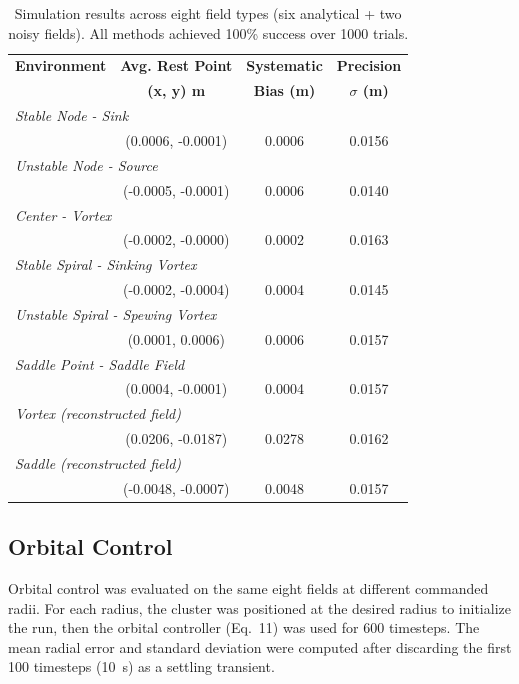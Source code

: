 \documentclass[lettersize,journal]{IEEEtran}
\begin{document}
\begin{table}[!t]
\footnotesize
\centering
\caption{Simulation results across eight field types (six analytical + two noisy fields). All methods achieved 100\% success over 1000 trials.}
\label{tab:simulation_estimation_results}
\setlength{\tabcolsep}{4pt}
\begin{tabular}{lccc}
\hline
\textbf{Environment} & \textbf{Avg. Rest Point} & \textbf{Systematic} & \textbf{Precision} \\
 & \textbf{(x, y) m} & \textbf{Bias (m)} & \textbf{$\sigma$ (m)} \\
\hline
\multicolumn{4}{l}{\textit{Stable Node - Sink}} \\
\hline
 & (0.0006, -0.0001) & 0.0006 & 0.0156 \\
\hline
\multicolumn{4}{l}{\textit{Unstable Node - Source}} \\
\hline
 & (-0.0005, -0.0001) & 0.0006 & 0.0140 \\
\hline
\multicolumn{4}{l}{\textit{Center - Vortex}} \\
\hline
 & (-0.0002, -0.0000) & 0.0002 & 0.0163 \\
\hline
\multicolumn{4}{l}{\textit{Stable Spiral - Sinking Vortex}} \\
\hline
 & (-0.0002, -0.0004) & 0.0004 & 0.0145 \\
\hline
\multicolumn{4}{l}{\textit{Unstable Spiral - Spewing Vortex}} \\
\hline
 & (0.0001, 0.0006) & 0.0006 & 0.0157 \\
\hline
\multicolumn{4}{l}{\textit{Saddle Point - Saddle Field}} \\
\hline
 & (0.0004, -0.0001) & 0.0004 & 0.0157 \\
\hline
\multicolumn{4}{l}{\textit{Vortex (reconstructed field)}} \\
\hline
 & (0.0206, -0.0187) & 0.0278 & 0.0162 \\
\hline
\multicolumn{4}{l}{\textit{Saddle (reconstructed field)}} \\
\hline
 & (-0.0048, -0.0007) & 0.0048 & 0.0157 \\
\hline
\end{tabular}
\end{table}


\subsection{Orbital Control}

Orbital control was evaluated on the same eight fields at different commanded radii. For each radius, the cluster was positioned at the desired radius to initialize the run, then the orbital controller (Eq.~11) was used for 600 timesteps. The mean radial error and standard deviation were computed after discarding the first 100 timesteps (10~s) as a settling transient.
\end{document}
